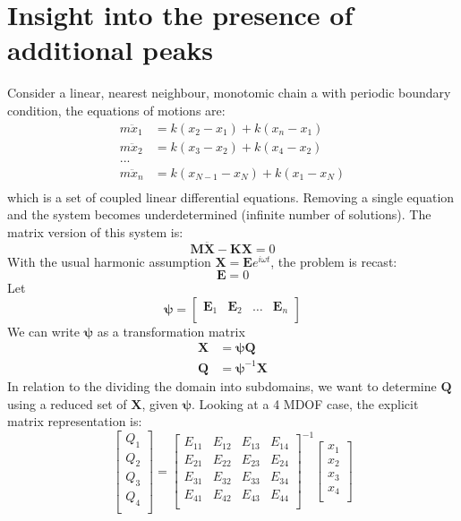 \chapter{Insight into the presence of additional peaks}\label{appendix:b}
Consider a linear, nearest neighbour, monotomic chain a with periodic boundary condition, the equations of motions are:
\begin{equation}
\begin{split}
m\ddot{x}_1&=k(x_2-x_1)+k(x_n-x_1)\\
m\ddot{x}_2&=k(x_3-x_2)+k(x_4-x_2)\\
...\\
m\ddot{x}_n&=k(x_{N-1}-x_N)+k(x_1-x_N)\\
\end{split}
\end{equation}
which is a set of coupled linear differential equations. Removing a single equation and the system becomes underdetermined (infinite number of solutions). The matrix version of this system is:
\begin{equation}
\bm{M}\bm{\ddot{X}}-\bm{K}\bm{X}=0
\end{equation}
With the usual harmonic assumption $\bm{X}=\bm{E}e^{i\omega t}$, the problem is recast:
\begin{equation}
[\omega^2\bm{M}^{-1}\bm{M}-\bm{M}^{-1}\bm{K}]\bm{E}=0
\end{equation}
Let
\[
\bm{\psi}=
\begin{bmatrix}
   \bm{E}_1 & \bm{E}_2 & \dots &\bm{E}_n \\
 \end{bmatrix}
\]
We can write $\bm{\psi}$ as a transformation matrix
\begin{equation}
\begin{split}
\bm{X}&=\bm{\psi}\bm{Q}\\
\bm{Q}&=\bm{\psi}^{-1}\bm{X}
\end{split}
\end{equation}
In relation to the dividing the domain into subdomains, we want to determine $\bm{Q}$ using a reduced set of $\bm{X}$, given $\bm{\psi}$. Looking at a 4 MDOF case, the explicit matrix representation is:
\[
\begin{bmatrix}
   Q_1\\
   Q_2\\
   Q_3\\
   Q_4\\
\end{bmatrix}=
\begin{bmatrix}
   E_{11} & E_{12} & E_{13} & E_{14} \\
   E_{21} & E_{22} & E_{23} & E_{24} \\
   E_{31} & E_{32} & E_{33} & E_{34} \\
   E_{41} & E_{42} & E_{43} & E_{44} \\
\end{bmatrix}^{-1}
\begin{bmatrix}
   x_1\\
   x_2\\
   x_3\\
   x_4\\
\end{bmatrix}
\]

